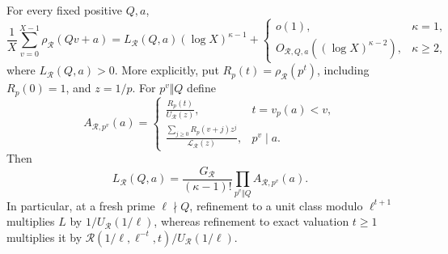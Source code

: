\begin{lemma}
\label{lem:v5-log-profile-mean}
For every fixed positive $Q,a$,
\[
 \frac1X\sum_{v=0}^{X-1}\rho_{\mathcal R}(Qv+a)
  =L_{\mathcal R}(Q,a)(\log X)^{\kappa-1}
    +\begin{cases}o(1),&\kappa=1,\\
                   O_{\mathcal R,Q,a}((\log X)^{\kappa-2}),&\kappa\geq2,
      \end{cases}
\]
where $L_{\mathcal R}(Q,a)>0$. More explicitly, put
$R_p(t)=\rho_{\mathcal R}(p^t)$, including $R_p(0)=1$, and $z=1/p$.
For $p^v\Vert Q$ define
\[
 A_{\mathcal R,p^v}(a)=
 \begin{cases}
 \displaystyle\frac{R_p(t)}{U_{\mathcal R}(z)},
       &t=v_p(a)<v,\\[6pt]
 \displaystyle\frac{\sum_{j\geq0}R_p(v+j)z^j}
                       {\mathcal L_{\mathcal R}(z)},
       &p^v\mid a.
 \end{cases}
\]
Then
\[
 L_{\mathcal R}(Q,a)
  =\frac{G_{\mathcal R}}{(\kappa-1)!}
       \prod_{p^v\Vert Q}A_{\mathcal R,p^v}(a).
\]
In particular, at a fresh prime $\ell\nmid Q$, refinement to a unit
class modulo $\ell^{t+1}$ multiplies $L$ by $1/U_{\mathcal R}(1/\ell)$,
whereas refinement to exact valuation $t\geq1$ multiplies it by
$\mathcal R(1/\ell,\ell^{-t},t)/U_{\mathcal R}(1/\ell)$.
\end{lemma}
